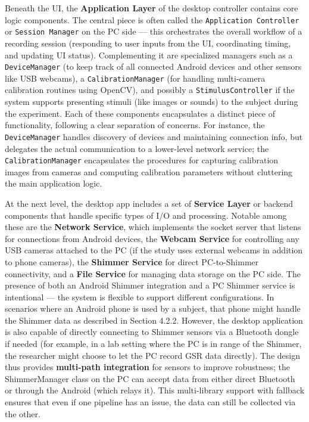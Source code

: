 \documentclass[11pt,a4paper]{report}
\begin{document}
Beneath the UI, the \textbf{Application Layer} of the desktop controller
contains core logic components. The central piece is often called the
\texttt{Application Controller} or \texttt{Session Manager} on the PC side --- this
orchestrates the overall workflow of a recording session (responding to
user inputs from the UI, coordinating timing, and updating UI status).
Complementing it are specialized managers such as a \texttt{DeviceManager} (to
keep track of all connected Android devices and other sensors like USB
webcams), a \texttt{CalibrationManager} (for handling multi-camera calibration
routines using OpenCV), and possibly a \texttt{StimulusController} if the
system supports presenting stimuli (like images or sounds) to the
subject during the
experiment\cite{InstantStressSmartphone2019}.
Each of these components encapsulates a distinct piece of functionality,
following a clear separation of concerns. For instance, the
\texttt{DeviceManager} handles discovery of devices and maintaining connection
info, but delegates the actual communication to a lower-level network
service; the \texttt{CalibrationManager} encapsulates the procedures for
capturing calibration images from cameras and computing calibration
parameters without cluttering the main application logic.

At the next level, the desktop app includes a set of \textbf{Service Layer}
or backend components that handle specific types of I/O and processing.
Notable among these are the \textbf{Network Service}, which implements the
socket server that listens for connections from Android devices, the
\textbf{Webcam Service} for controlling any USB cameras attached to the PC
(if the study uses external webcams in addition to phone cameras), the
\textbf{Shimmer Service} for direct PC-to-Shimmer connectivity, and a \textbf{File
Service} for managing data storage on the PC
side\cite{InstantStressSmartphone2019}.
The presence of both an Android Shimmer integration and a PC Shimmer
service is intentional --- the system is flexible to support different
configurations. In scenarios where an Android phone is used by a
subject, that phone might handle the Shimmer data as described in
Section 4.2.2. However, the desktop application is also capable of
directly connecting to Shimmer sensors via a Bluetooth dongle if needed
(for example, in a lab setting where the PC is in range of the Shimmer,
the researcher might choose to let the PC record GSR data directly). The
design thus provides \textbf{multi-path integration} for sensors to improve
robustness; the ShimmerManager class on the PC can accept data from either
direct Bluetooth or through the Android (which relays it). This
multi-library support with fallback ensures that even if one pipeline
has an issue, the data can still be collected via the
other\cite{InstantStressSmartphone2019}.
\end{document}
